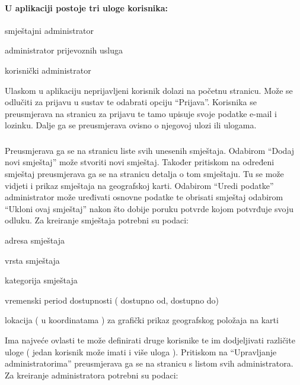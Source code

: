 		
		\paragraph{\indent \textmd{U aplikaciji postoje tri uloge korisnika:}}
		
		\begin{packed_item}
			\item smještajni administrator
			\item administrator prijevoznih usluga
			\item korisnički administrator
		\end{packed_item}
		
		\noindent Ulaskom u aplikaciju neprijavljeni korisnik dolazi na početnu stranicu. Može se odlučiti za prijavu u sustav te odabrati opciju “Prijava”. Korisnika se preusmjerava na stranicu za prijavu te tamo upisuje svoje podatke e-mail i lozinku. Dalje ga se preusmjerava ovisno o njegovoj ulozi ili ulogama.
		
		\subsubsection{\noindent {}}
		
		Preusmjerava ga se na stranicu liste svih unesenih smještaja. Odabirom “Dodaj novi smještaj”  može stvoriti novi smještaj. Također pritiskom na određeni smještaj preusmjerava ga se na stranicu detalja o tom smještaju. Tu se može vidjeti i prikaz smještaja na geografskoj karti. Odabirom “Uredi podatke” administrator može uređivati osnovne podatke te obrisati smještaj odabirom “Ukloni ovaj smještaj” nakon što dobije poruku potvrde kojom potvrđuje svoju odluku. Za kreiranje smještaja potrebni su podaci:
		 
		\begin{packed_item}
			\item adresa smještaja
			\item vrsta smještaja
			\item kategorija smještaja
			\item vremenski period dostupnosti ( dostupno od, dostupno do) 
			\item lokacija ( u koordinatama ) za grafički prikaz geografskog položaja na karti 
		\end{packed_item}
		
		\noindent Ima najveće ovlasti te može definirati druge korisnike te im dodjeljivati različite uloge ( jedan korisnik može imati i više uloga ). Pritiskom na “Upravljanje administratorima” preusmjerava ga se na stranicu s listom svih administratora. Za kreiranje administratora potrebni su podaci: 
		
